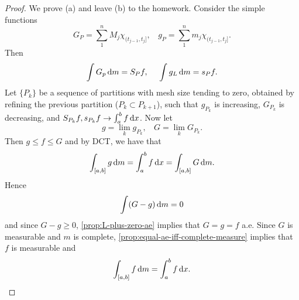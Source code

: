 \documentclass[12pt]{article} %
\begin{document}
\begin{proof}
    We prove (a) and leave (b) to the homework. Consider the simple functions \[G_P = \sum_1^n M_j \chi_{(t_{j-1}, t_j]}, \ \ \ \ g_P = \sum_1^n m_j \chi_{(t_{j-1}, t_j]}.\] Then \[\int G_p \, \mathrm{d} m = S_P f, \ \ \ \ \int g_L \, \mathrm{d} m = s_P f.\] Let $\{P_k\}$ be a sequence of partitions with mesh size tending to zero, obtained by refining the previous partition ($P_k \subset P_{k+1}$), such that $g_{P_k}$ is increasing, $G_{P_k}$ is decreasing, and $S_{P_k} f, s_{P_k} f \to \int_a^b f \, \mathrm{d} x$. Now let \[g = \lim_k g_{P_k}, \ \ \ \ G = \lim_k G_{P_k}.\] Then $g \leq f \leq G$ and by DCT, we have that \[\int_{[a, b]} g \, \mathrm{d} m = \int_a^b f \, \mathrm{d} x = \int_{[a, b]} G \, \mathrm{d} m.\] Hence \[\int(G - g) \, \mathrm{d} m = 0\] and since $G - g \geq 0$, \cref{prop:L-plus-zero-ae} implies that $G = g = f$ a.e. Since $G$ is measurable and $m$ is complete, \cref{prop:equal-ae-iff-complete-measure} implies that $f$ is measurable and \[\int_{[a, b]} f \, \mathrm{d} m = \int_a^b f \, \mathrm{d} x.\]
\end{proof}



\pagebreak

\small



\end{document}
